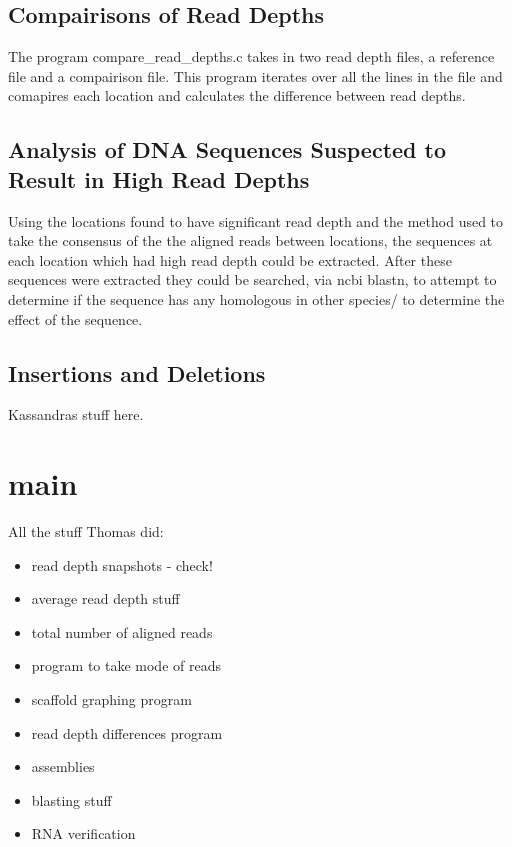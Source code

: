 \documentclass[12pt]{article}
\begin{document}
\subsection{Compairisons of Read Depths}
	The program compare\_read\_depths.c takes in two read depth files, a reference file and a compairison file. This program iterates over all the lines in the file and comapires each location and calculates the difference between read depths.

\subsection{Analysis of DNA Sequences Suspected to Result in High Read Depths}
	Using the locations found to have significant read depth and the method used to take the consensus of the the aligned reads between locations, the sequences at each location which had high read depth could be extracted. After these sequences were extracted they could be searched, via ncbi blastn, to attempt to determine if the sequence has any homologous in other species/ to determine the effect of the sequence.


\subsection{Insertions and Deletions}

	Kassandras stuff here.


\section{main}
All the stuff Thomas did:
\begin{itemize}
	\item read depth snapshots - check!
	\item average read depth stuff
	\item total number of aligned reads
	\item program to take mode of reads
	\item scaffold graphing program
	\item read depth differences program
	\item assemblies
	\item blasting stuff
	\item RNA verification
\end{itemize}
%
%
\end{document}
